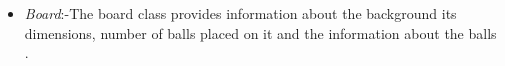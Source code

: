 \begin{itemize}
\item \textit{Board}:-The board class provides information about the background its dimensions, number of balls placed on it and the information about the balls .


\end{itemize}
